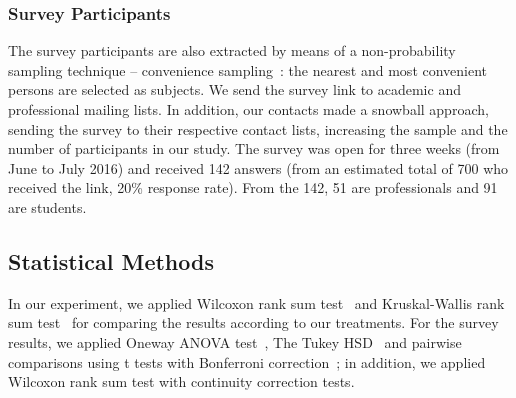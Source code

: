 \subsubsection{Survey Participants}
\label{sec:surveyPart}

The survey participants are also extracted by means of a 
non-probability sampling technique -- convenience
sampling~\cite{wohlin}: the nearest and most convenient persons are selected as subjects. We send
the survey link to academic and professional mailing lists.
In addition, our contacts made a snowball approach, sending the survey to their respective
contact lists, increasing the sample and the number of participants in our study.
The survey was open for three weeks (from June to July 2016) and received 142
answers (from an estimated total of 700 who received the link, 20\% response
rate). From the 142, 51 are professionals and 91 are students.

\subsection{Statistical Methods}
\label{sec:statisticalMethods}

In our experiment, we applied Wilcoxon rank sum test~\cite{statistical} and Kruskal-Wallis rank sum test~\cite{statistical} for comparing the results according to our treatments. For the survey results, we applied Oneway ANOVA test~\cite{statistical}, The Tukey HSD~\cite{statistical} and pairwise comparisons using t tests
with Bonferroni correction~\cite{statistical}; in addition, we applied Wilcoxon rank sum test with continuity correction
tests.
